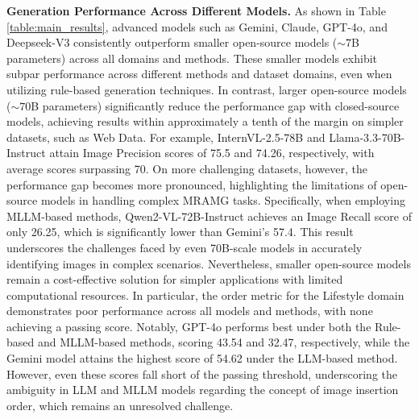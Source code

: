 \textbf{Generation Performance Across Different Models.} As shown in Table \ref{table:main_results}, advanced models such as Gemini, Claude, GPT-4o, and Deepseek-V3 consistently outperform smaller open-source models ($\sim7$B parameters) across all domains and methods. These smaller models exhibit subpar performance across different methods and dataset domains, even when utilizing rule-based generation techniques. In contrast, larger open-source models ($\sim70$B parameters) significantly reduce the performance gap with closed-source models, achieving results within approximately a tenth of the margin on simpler datasets, such as Web Data. For example, InternVL-2.5-78B and Llama-3.3-70B-Instruct attain Image Precision scores of 75.5 and 74.26, respectively, with average scores surpassing 70. On more challenging datasets, however, the performance gap becomes more pronounced, highlighting the limitations of open-source models in handling complex MRAMG tasks. Specifically, when employing MLLM-based methods, Qwen2-VL-72B-Instruct achieves an Image Recall score of only 26.25, which is significantly lower than Gemini's 57.4. This result underscores the challenges faced by even 70B-scale models in accurately identifying images in complex scenarios.  
Nevertheless, smaller open-source models remain a cost-effective solution for simpler applications with limited computational resources. In particular, the order metric for the Lifestyle domain demonstrates poor performance across all models and methods, with none achieving a passing score. Notably, GPT-4o performs best under both the Rule-based and MLLM-based methods, scoring 43.54 and 32.47, respectively, while the Gemini model attains the highest score of 54.62 under the LLM-based method. However, even these scores fall short of the passing threshold, underscoring the ambiguity in LLM and MLLM models regarding the concept of image insertion order, which remains an unresolved challenge.





















